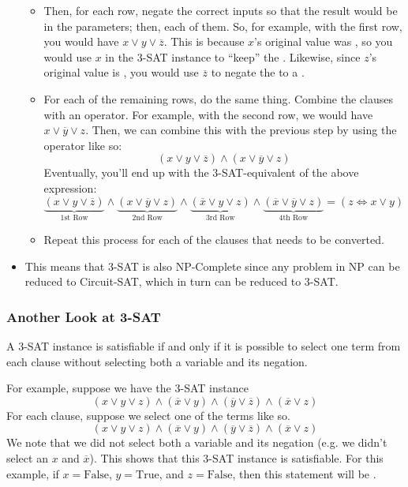 \documentclass[letterpaper]{article}
\begin{document}
\begin{itemize}
\begin{mdframed}[]
\begin{itemize}
            \item Then, for each row, negate the correct inputs so that the result would be  in the parameters; then,  each of them. So, for example, with the first row, you would have $x \lor y \lor \overline{z}$. This is because $x$'s original value was , so you would use $x$ in the 3-SAT instance to ``keep'' the . Likewise, since $z$'s original value is , you would use $\overline{z}$ to negate the  to a . 
            \item For each of the remaining rows, do the same thing. Combine the clauses with an  operator. For example, with the second row, we would have $x \lor \overline{y} \lor z$. Then, we can combine this with the previous step by using the  operator like so: 
            \[(x \lor y \lor \overline{z}) \land (x \lor \overline{y} \lor z)\]
            Eventually, you'll end up with the 3-SAT-equivalent of the above expression:
            \[\underbrace{(x \lor y \lor \overline{z})}_{\text{1st Row}} \land \underbrace{(x \lor \overline{y} \lor z)}_{\text{2nd Row}} \land \underbrace{(\overline{x} \lor y \lor z)}_{\text{3rd Row}} \land \underbrace{(\overline{x} \lor \overline{y} \lor z)}_{\text{4th Row}} = (z \iff x \lor y)\]
            \item Repeat this process for each of the clauses that needs to be converted. 
        \end{itemize}
    \end{mdframed}

    \item This means that 3-SAT is also NP-Complete since any problem in NP can be reduced to Circuit-SAT, which in turn can be reduced to 3-SAT.
\end{itemize}

\subsubsection{Another Look at 3-SAT}
\begin{lemma}{}{}
    A 3-SAT instance is satisfiable if and only if it is possible to select one term from each clause without selecting both a variable and its negation. 
\end{lemma}

For example, suppose we have the 3-SAT instance 
\[(x \lor y \lor z) \land (\overline{x} \lor y) \land (\overline{y} \lor \overline{z}) \land (\overline{x} \lor z)\]
For each clause, suppose we select one of the terms like so.  
\[(x \lor \boxed{y} \lor z) \land (\boxed{\overline{x}} \lor y) \land (\overline{y} \lor \boxed{\overline{z}}) \land (\boxed{\overline{x}} \lor z)\]
We note that we did not select both a variable and its negation (e.g. we didn't select an $x$ and $\overline{x}$). This shows that this 3-SAT instance is satisfiable. For this example, if $x = \text{False}$, $y = \text{True}$, and $z = \text{False}$, then this statement will be .
\end{document}
